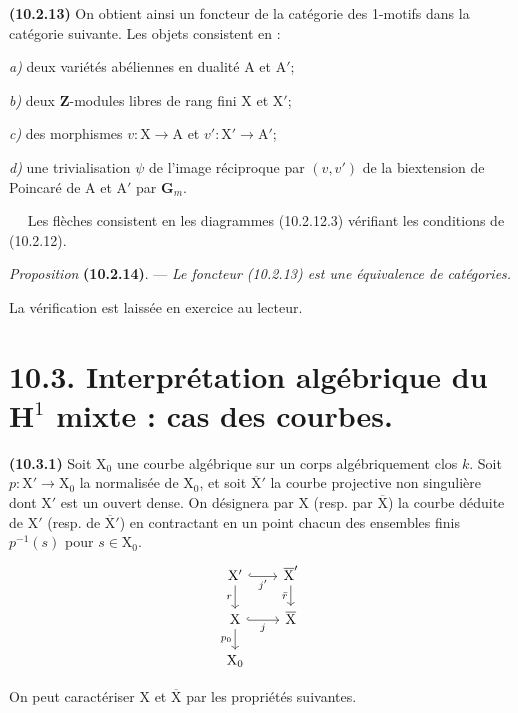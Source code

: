 \documentclass[11pt,leqno]{article}
\newcommand{\Page}[1]{\ifvmode\noindent\else\unskip\ \fi{\footnotesize\textcolor{gray}{[p.\,#1]}}\ \ignorespaces}
\begin{document}
\textbf{(10.2.13)} On obtient ainsi un foncteur de la catégorie
des 1-motifs dans la catégorie suivante. Les objets consistent en :

\noindent\textit{a)} deux variétés abéliennes en dualité
\(\mathrm{A}\) et \(\mathrm{A}'\);

\noindent\textit{b)} deux \(\mathbf{Z}\)-modules libres de rang
fini \(\mathrm{X}\) et \(\mathrm{X}'\);

\noindent\textit{c)} des morphismes
\(v:\mathrm{X}\to\mathrm{A}\) et
\(v':\mathrm{X}'\to\mathrm{A}'\);

\noindent\textit{d)} une trivialisation \(\psi\) de l’image
réciproque par \((v,v')\) de la biextension de Poincaré de
\(\mathrm{A}\) et \(\mathrm{A}'\) par \(\mathbf{G}_m\).

\Page{69}
Les flèches consistent en les diagrammes (10.2.12.3) vérifiant les conditions de (10.2.12).

\textit{Proposition} \textbf{(10.2.14)}. — \textit{Le foncteur \textup{(10.2.13)} est une équivalence de catégories.}

La vérification est laissée en exercice au lecteur.

\section*{10.3. Interprétation algébrique du \(\mathbf{H}^{1}\) mixte : cas des courbes.}

\textbf{(10.3.1)} Soit \(\mathrm{X}_0\) une courbe algébrique sur un corps algébriquement clos \(k\). Soit \(p:\mathrm{X}'\to\mathrm{X}_0\) la normalisée de \(\mathrm{X}_0\), et soit \(\overline{\mathrm{X}}'\) la courbe projective non singulière dont \(\mathrm{X}'\) est un ouvert dense. On désignera par \(\mathrm{X}\) (resp. par \(\overline{\mathrm{X}}\)) la courbe déduite de \(\mathrm{X}'\) (resp. de \(\overline{\mathrm{X}}'\)) en contractant en un point chacun des ensembles finis \(p^{-1}(s)\) pour \(s\in\mathrm{X}_0\).
\[
\begin{tikzcd}[column sep=2em,row sep=1.5em]
\mathrm{X}' \arrow[r,hook,"j'"'] \arrow[d,"r"']
  & \overline{\mathrm{X}}' \arrow[d,"\bar r"'] \\
\mathrm{X} \arrow[r,hook,"j"'] \arrow[d,"p_0"']
  & \overline{\mathrm{X}} \\
\mathrm{X}_0 &
\end{tikzcd}
\]

On peut caractériser \(\mathrm{X}\) et \(\overline{\mathrm{X}}\) par les propriétés suivantes.
\end{document}
